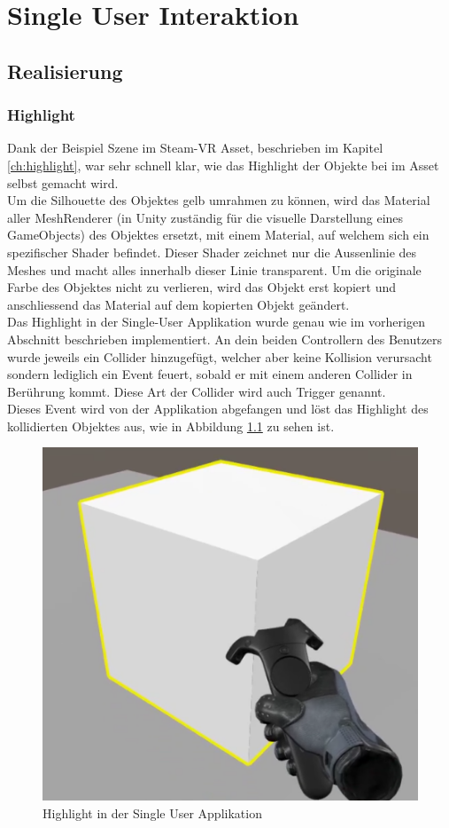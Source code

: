 \chapter{Single User Interaktion}
\label{ch:Single_User_Interaktion}

\section{Realisierung}

\subsection{Highlight}
\label{ch:highlight_realisierung}
Dank der Beispiel Szene im Steam-VR Asset, beschrieben im Kapitel \ref{ch:highlight}, war sehr schnell klar, wie das Highlight der Objekte bei im Asset selbst gemacht wird. \\
Um die Silhouette des Objektes gelb umrahmen zu können, wird das Material aller MeshRenderer (in Unity zuständig für die visuelle Darstellung eines GameObjects) des Objektes ersetzt, mit einem Material, auf welchem sich ein spezifischer Shader befindet. Dieser Shader zeichnet nur die Aussenlinie des Meshes und macht alles innerhalb dieser Linie transparent. Um die originale Farbe des Objektes nicht zu verlieren, wird das Objekt erst kopiert und anschliessend das Material auf dem kopierten Objekt geändert. \\

\noindent Das Highlight in der Single-User Applikation wurde genau wie im vorherigen Abschnitt beschrieben implementiert. An dein beiden Controllern des Benutzers wurde jeweils ein Collider hinzugefügt, welcher aber keine Kollision verursacht sondern lediglich ein Event feuert, sobald er mit einem anderen Collider in Berührung kommt. Diese Art der Collider wird auch Trigger genannt. \\
Dieses Event wird von der Applikation abgefangen und löst das Highlight des kollidierten Objektes aus, wie in Abbildung \ref{fig:highlight_single_user_application} zu sehen ist.

\begin{figure}[h!]
	\centering
	\includegraphics[keepaspectratio,width=0.4\linewidth]{img/Single_User_Highlight.PNG}
	\caption{Highlight in der Single User Applikation}
	\label{fig:highlight_single_user_application}
\end{figure}


